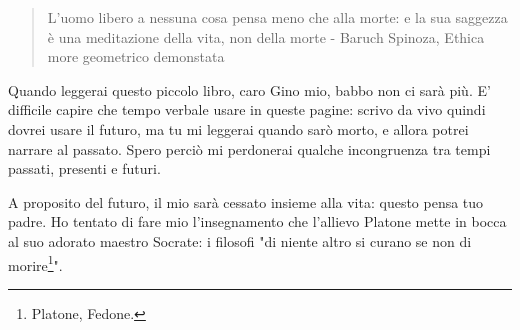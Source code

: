 \begin{quotation}
	\small L'uomo libero a nessuna cosa pensa meno che alla morte: e la sua saggezza è una meditazione della vita, non della morte - Baruch Spinoza, Ethica more geometrico demonstata
\end{quotation}

Quando leggerai questo piccolo libro, caro Gino mio, babbo non ci sarà più. E' difficile capire che tempo verbale usare in queste pagine: scrivo da vivo quindi dovrei usare il futuro, ma tu mi leggerai quando sarò morto, e allora potrei narrare al passato. Spero perciò mi perdonerai qualche incongruenza tra tempi passati, presenti e futuri.

A proposito del futuro, il mio sarà cessato insieme alla vita: questo pensa tuo padre. Ho tentato di fare mio l'insegnamento che l'allievo Platone mette in bocca al suo adorato maestro Socrate: i filosofi "di niente altro si curano se non di morire\footnote{Platone, Fedone.}".